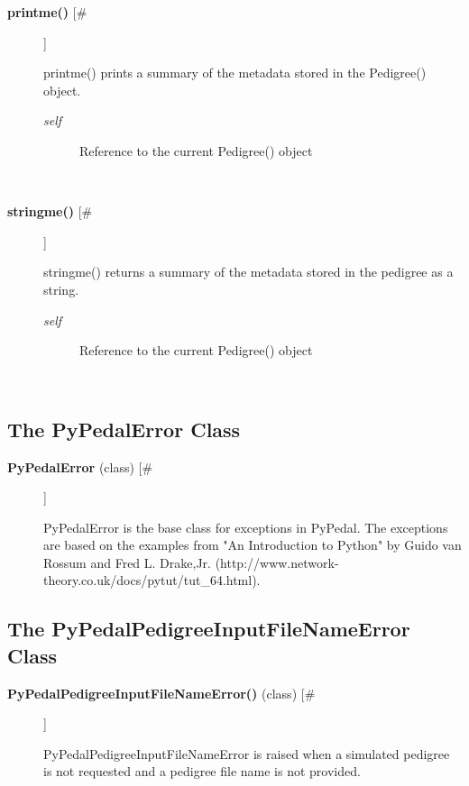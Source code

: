\documentclass{article}
\begin{document}
\begin{description}
\item[\textbf{printme()} [\#]
]
\par printme() prints a summary of the metadata stored in the Pedigree() object.
\begin{description}
\item[\textit{self}
]
Reference to the current Pedigree() object
\end{description}\\

\item[\textbf{stringme()} [\#]
]
\par stringme() returns a summary of the metadata stored in the pedigree as
a string.
\begin{description}
\item[\textit{self}
]
Reference to the current Pedigree() object
\end{description}\\

\end{description}
\subsection*{The PyPedalError Class}
\begin{description}
\item[\textbf{PyPedalError} (class)  [\#]
]
\par PyPedalError is the base class for exceptions in PyPedal. The exceptions
are based on the examples from "An Introduction to Python" by Guido van
Rossum and Fred L. Drake,Jr.
(http://www.network-theory.co.uk/docs/pytut/tut\_64.html).

\end{description}
\subsection*{The PyPedalPedigreeInputFileNameError Class}
\begin{description}
\item[\textbf{PyPedalPedigreeInputFileNameError()} (class) [\#]
]
\par PyPedalPedigreeInputFileNameError is raised when a simulated pedigree
is not requested and a pedigree file name is not provided.

\end{description}
\end{document}
